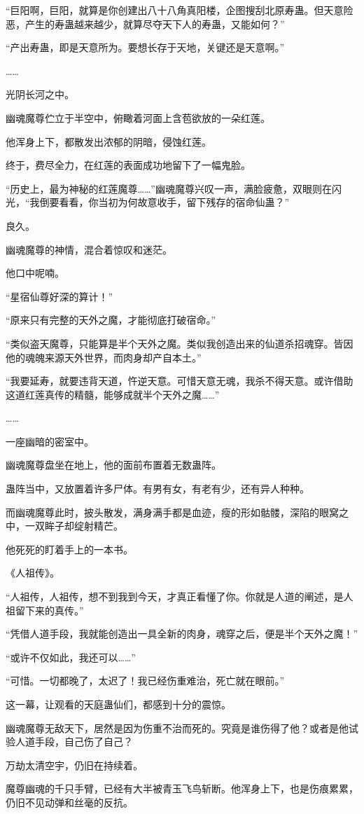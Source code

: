 \begin{this_body}
“巨阳啊，巨阳，就算是你创建出八十八角真阳楼，企图搜刮北原寿蛊。但天意险恶，产生的寿蛊越来越少，就算尽夺天下人的寿蛊，又能如何？”

“产出寿蛊，即是天意所为。要想长存于天地，关键还是天意啊。”

……

光阴长河之中。

幽魂魔尊伫立于半空中，俯瞰着河面上含苞欲放的一朵红莲。

他浑身上下，都散发出浓郁的阴暗，侵蚀红莲。

终于，费尽全力，在红莲的表面成功地留下了一幅鬼脸。

“历史上，最为神秘的红莲魔尊……”幽魂魔尊兴叹一声，满脸疲惫，双眼则在闪光，“我倒要看看，你当初为何故意收手，留下残存的宿命仙蛊？”

良久。

幽魂魔尊的神情，混合着惊叹和迷茫。

他口中呢喃。

“星宿仙尊好深的算计！”

“原来只有完整的天外之魔，才能彻底打破宿命。”

“类似盗天魔尊，只能算是半个天外之魔。类似我创造出来的仙道杀招魂穿。皆因他的魂魄来源天外世界，而肉身却产自本土。”

“我要延寿，就要违背天道，忤逆天意。可惜天意无魂，我杀不得天意。或许借助这道红莲真传的精髓，能够成就半个天外之魔……”

……

一座幽暗的密室中。

幽魂魔尊盘坐在地上，他的面前布置着无数蛊阵。

蛊阵当中，又放置着许多尸体。有男有女，有老有少，还有异人种种。

而幽魂魔尊此时，披头散发，满身满手都是血迹，瘦的形如骷髅，深陷的眼窝之中，一双眸子却绽射精芒。

他死死的盯着手上的一本书。

《人祖传》。

“人祖传，人祖传，想不到我到今天，才真正看懂了你。你就是人道的阐述，是人祖留下来的真传。”

“凭借人道手段，我就能创造出一具全新的肉身，魂穿之后，便是半个天外之魔！”

“或许不仅如此，我还可以……”

“可惜。一切都晚了，太迟了！我已经伤重难治，死亡就在眼前。”

这一幕，让观看的天庭蛊仙们，都感到十分的震惊。

幽魂魔尊无敌天下，居然是因为伤重不治而死的。究竟是谁伤得了他？或者是他试验人道手段，自己伤了自己？

万劫太清空宇，仍旧在持续着。

魔尊幽魂的千只手臂，已经有大半被青玉飞鸟斩断。他浑身上下，也是伤痕累累，仍旧不见动弹和丝毫的反抗。

\end{this_body}

